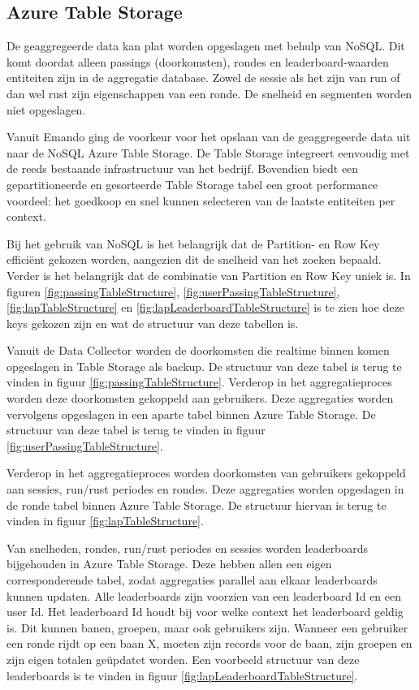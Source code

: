 \subsection{Azure Table Storage}
De geaggregeerde data kan plat worden opgeslagen met behulp van NoSQL. Dit komt doordat alleen passings (doorkomsten), rondes en leaderboard-waarden entiteiten zijn in de aggregatie database. Zowel de sessie als het zijn van run of dan wel rust zijn eigenschappen van een ronde. De snelheid en segmenten worden niet opgeslagen.

Vanuit Emando ging de voorkeur voor het opslaan van de geaggregeerde data  uit naar de NoSQL Azure Table Storage. De Table Storage integreert eenvoudig met de reeds bestaande infrastructuur van het bedrijf. Bovendien biedt een gepartitioneerde en gesorteerde Table Storage tabel een groot performance voordeel: het goedkoop en snel kunnen selecteren van de laatste entiteiten per context.

Bij het gebruik van NoSQL is het belangrijk dat de Partition- en Row Key efficiënt gekozen worden, aangezien dit de snelheid van het zoeken bepaald. Verder is het belangrijk dat de combinatie van Partition en Row Key uniek is. In figuren \ref{fig:passingTableStructure}, \ref{fig:userPassingTableStructure}, \ref{fig:lapTableStructure} en \ref{fig:lapLeaderboardTableStructure} is te zien hoe deze keys gekozen zijn en wat de structuur van deze tabellen is.

Vanuit de Data Collector worden de doorkomsten die realtime binnen komen opgeslagen in Table Storage als backup. De structuur van deze tabel is terug te vinden in figuur \ref{fig:passingTableStructure}. Verderop in het aggregatieproces worden deze doorkomsten gekoppeld aan gebruikers. Deze aggregaties worden vervolgens opgeslagen in een aparte tabel binnen Azure Table Storage. De structuur van deze tabel is terug te vinden in figuur \ref{fig:userPassingTableStructure}.

Verderop in het aggregatieproces worden doorkomsten van gebruikers gekoppeld aan sessies, run/rust periodes en rondes. Deze aggregaties worden opgeslagen in de ronde tabel binnen Azure Table Storage. De structuur hiervan is terug te vinden in figuur \ref{fig:lapTableStructure}.


Van snelheden, rondes, run/rust periodes en sessies worden leaderboards bijgehouden in Azure Table Storage. Deze hebben allen een eigen corresponderende tabel, zodat aggregaties parallel aan elkaar leaderboards kunnen updaten.
Alle leaderboards zijn voorzien van een leaderboard Id en een user Id. Het leaderboard Id houdt bij voor welke context het leaderboard geldig is. Dit kunnen banen, groepen, maar ook gebruikers zijn. Wanneer een gebruiker een ronde rijdt op een baan X, moeten zijn records voor de baan, zijn groepen en zijn eigen totalen geüpdatet worden. Een voorbeeld structuur van deze leaderboards is te vinden in figuur \ref{fig:lapLeaderboardTableStructure}.

